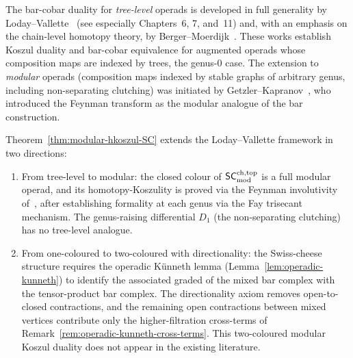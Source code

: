 \begin{remark}
\label{rem:modular-hkoszul-literature}
The bar-cobar duality for \emph{tree-level} operads is
developed in full generality by Loday--Vallette~\cite{LV12}
(see especially Chapters~6, 7, and~11) and, with an emphasis
on the chain-level homotopy theory, by
Berger--Moerdijk~\cite{BM03}. These works establish Koszul
duality and bar-cobar equivalence for augmented operads whose
composition maps are indexed by trees, the genus-$0$ case.
The extension to \emph{modular} operads (composition maps
indexed by stable graphs of arbitrary genus, including
non-separating clutching) was initiated by
Getzler--Kapranov~\cite{GK98}, who introduced the Feynman
transform as the modular analogue of the bar construction.

Theorem~\ref{thm:modular-hkoszul-SC} extends the
Loday--Vallette framework in two directions:
\begin{enumerate}[label=\textup{(\roman*)}]
\item From tree-level to modular: the closed colour of $\mathsf{SC}^{\mathrm{ch,top}}_{\mathrm{mod}}$
 is a full modular operad, and its homotopy-Koszulity is proved
 via the Feynman involutivity of~\cite{GK98}, after establishing
 formality at each genus via the Fay trisecant mechanism.
 The genus-raising differential $D_1$ (the non-separating
 clutching) has no tree-level analogue.
\item From one-coloured to two-coloured with directionality:
 the Swiss-cheese structure requires the operadic K\"unneth
 lemma (Lemma~\ref{lem:operadic-kunneth}) to identify the
 associated graded of the mixed bar complex with the
 tensor-product bar complex. The directionality axiom removes
 open-to-closed contractions, and the remaining open
 contractions between mixed vertices contribute only the
 higher-filtration cross-terms of
 Remark~\ref{rem:operadic-kunneth-cross-terms}.
 This two-coloured modular Koszul duality does not appear in
 the existing literature.
\end{enumerate}
\end{remark}


